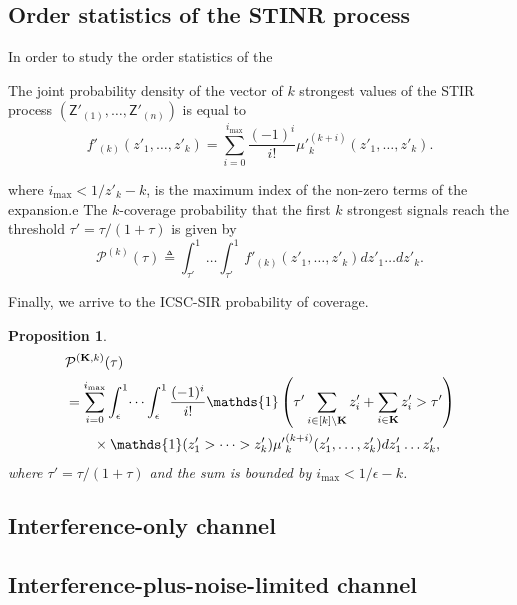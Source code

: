 \documentclass[lettersize,journal]{IEEEtran}
\newtheorem{prop}[theorem]{Proposition}
\begin{document}
\subsection{Order statistics of the STINR process}
In order to study the order statistics of the 

The joint probability density of the vector of $k$ strongest values of the STIR process $(\mathsf{Z}'_{(1)}, \dots, \mathsf{Z}'_{(n)})$ is equal to
\begin{equation}
  \label{eq:jointprobability}
  f'_{(k)}(z'_1,\dots,z'_k)= \sum^{i_{\text{max}}}_{i=0}\frac{(-1)^i}{i!}{\mu'}_k^{(k+i)}(z'_1,\dots,z'_k).
\end{equation}

where $i_{\text{max}}<1/z'_k-k$, is the maximum index of the non-zero terms of the expansion.e
The $k$-coverage probability that the first $k$ strongest signals reach the threshold $\tau' =\tau/(1+\tau)$ is given by
\begin{equation}
  \mathcal{P}^{(k)}(\tau) \triangleq  \int_{\tau'}^1\dots \int_{\tau'}^1 f'_{(k)}({z'_1},\dots,{z'_k})dz'_1 \dots d{z'_k}.
\end{equation}

Finally, we arrive to the ICSC-SIR probability of coverage.
\begin{prop}
  \begin{align}
    &\mathcal{P}^{(\mathbf{K},k)}(\tau) \nonumber\\
    &= \sum^{i_{\text{max}}}_{i=0} \int_{\epsilon}^1 \dots \int_{\epsilon}^1\frac{(-1)^i}{i!}\mathds{1}\left(\tau' \sum_{i \in [k] \setminus  \mathbf{K}}z'_i+ \sum_{i\in \mathbf{K}} z'_i>\tau' \right) \nonumber \\
    &\hspace{0.7cm}\times \mathds{1}(z'_1>\dots>z'_k){\mu'}_k^{(k+i)}(z'_1,\dots,z'_k) d z'_1 \dots z'_k,
  \end{align}
  where $\tau' = \tau/(1+\tau)$ and the sum is bounded by $i_{\text{max}}< 1/\epsilon-k$. 
\end{prop}

\subsection{Interference-only channel}

\subsection{Interference-plus-noise-limited channel}
\end{document}

